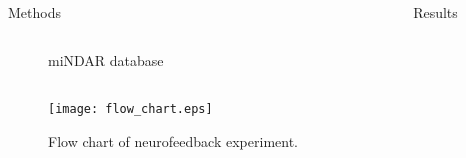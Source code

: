 \documentclass[final,hyperref={pdfpagelabels=false}]{beamer}
\newlength{\columnheight}
\begin{document}
\begin{frame}
\begin{columns}
\begin{column}{.5\textwidth}
{\begin{block}{Methods}
\begin{column}{.47\textwidth}
\begin{figure}
                        \caption{\label{fig:mindar}miNDAR database}
                    \end{figure}
                \end{column}
            \begin{figure}
                \begin{center}
                    \texttt{[image: flow\_chart.eps]}
                \end{center}
                \caption{\label{fig:processingflow}Flow chart of neurofeedback experiment.}
            \end{figure}
            \vfill
            \end{block}
          }
    \end{column}

    \begin{column}{.5\textwidth}
          \parbox[t][\columnheight]{\textwidth}{ %
            \begin{block}{Results}
				\begin{center}
			

\end{center}
\end{block}}
\end{column}
\end{columns}
\end{frame}
\end{document}
